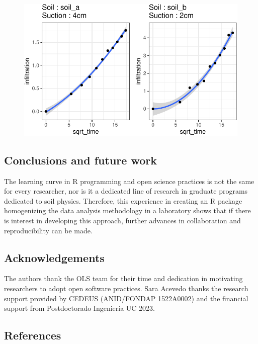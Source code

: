 \documentclass[
]{article}
\begin{document}
\begin{figure}[H]

{\centering \includegraphics{infiltrodiscR_paper_files/figure-pdf/unnamed-chunk-9-1.pdf}

}

\end{figure}

\hypertarget{conclusions-and-future-work}{%
\subsection{Conclusions and future
work}\label{conclusions-and-future-work}}

The learning curve in R programming and open science practices is not
the same for every researcher, nor is it a dedicated line of research in
graduate programs dedicated to soil physics. Therefore, this experience
in creating an R package homogenizing the data analysis methodology in a
laboratory shows that if there is interest in developing this approach,
further advances in collaboration and reproducibility can be made.

\hypertarget{acknowledgements}{%
\subsection{Acknowledgements}\label{acknowledgements}}

The authors thank the OLS team for their time and dedication in
motivating researchers to adopt open software practices. Sara Acevedo
thanks the research support provided by CEDEUS (ANID/FONDAP 1522A0002)
and the financial support from Postdoctorado Ingeniería UC 2023.

\hypertarget{references}{%
\subsection*{References}\label{references}}
\end{document}
